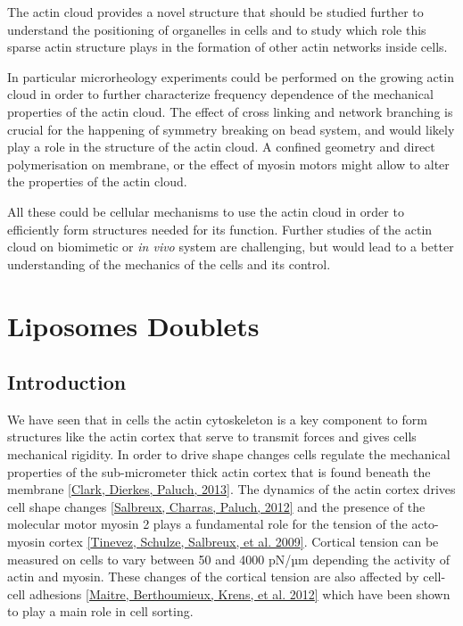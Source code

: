 \documentclass[A4paperpaper,11pt,english]{sphinxmanual}
\begin{document}
The actin cloud provides a novel structure that should be studied further to
understand the positioning of organelles in cells and to study which role this sparse
actin structure plays in the formation of other actin networks inside cells.

In particular microrheology experiments could be performed on the growing actin
cloud in order to further  characterize frequency dependence of the mechanical
properties  of the actin cloud. The effect of cross linking and network
branching is crucial for the happening of symmetry breaking on bead system, and
would likely play a role in the structure of the actin cloud. A confined
geometry and direct polymerisation on membrane, or the effect of myosin motors
might allow to alter the properties of the actin cloud.

All these could be cellular mechanisms to use the actin cloud in order
to efficiently form structures needed for its function.
Further studies of the actin cloud on biomimetic or \emph{in vivo} system are
challenging, but would lead to a better understanding of the mechanics of the
cells and its control.


\chapter{Liposomes Doublets}
\label{parts/part4:lib-doub}\label{parts/part4:liposomes-doublets}\label{parts/part4::doc}

\section{Introduction}
\label{parts/part4:introduction}
We have seen that in cells the actin cytoskeleton is a key component to form
structures like the actin cortex that serve to transmit forces and gives cells
mechanical rigidity. In order to drive shape changes cells regulate the
mechanical properties of the sub-micrometer thick actin cortex that is found
beneath the membrane {\hyperref[parts/part4:clark2013]{{[}Clark, Dierkes, Paluch,  2013{]}}}. The dynamics of the actin cortex
drives cell shape changes {\hyperref[parts/part4:salbreux2012b]{{[}Salbreux, Charras, Paluch,  2012{]}}} and the presence of the
molecular motor myosin 2 plays a fundamental role for the tension of the
acto-myosin cortex {\hyperref[parts/part4:tinevez2009]{{[}Tinevez, Schulze, Salbreux,  et al.  2009{]}}}. Cortical tension can be measured on
cells to vary between 50 and 4000 pN/µm depending the activity of actin and
myosin.  These changes of the cortical tension are also affected by cell-cell
adhesions {\hyperref[parts/part4:maitre2012]{{[}Maitre, Berthoumieux, Krens,  et al.  2012{]}}} which have been shown to play a main role in cell
sorting.
\end{document}
